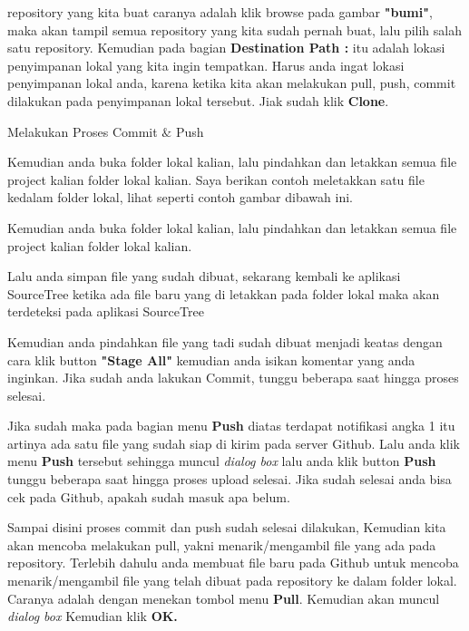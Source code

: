 \vspace{12pt}
\noindent 
repository yang kita buat caranya adalah klik browse pada gambar \textbf{"bumi"}, maka akan tampil semua repository yang kita sudah pernah buat, lalu pilih salah satu repository. Kemudian pada bagian \textbf{Destination Path : }itu adalah lokasi penyimpanan lokal yang kita ingin tempatkan.\vspace{\baselineskip}
\vspace{\baselineskip}
Harus anda ingat lokasi penyimpanan lokal anda, karena ketika kita akan melakukan pull, push, commit dilakukan pada penyimpanan lokal tersebut. Jiak sudah klik \textbf{Clone}. \par
\noindent 
Melakukan Proses Commit  $  \&  $ Push \par
\vspace{12pt}
\noindent 
Kemudian anda buka folder lokal kalian, lalu pindahkan dan letakkan semua file project kalian folder lokal kalian. Saya berikan contoh meletakkan satu file kedalam folder lokal, lihat seperti contoh gambar dibawah ini. \par
\vspace{12pt}
\noindent 
Kemudian anda buka folder lokal kalian, lalu pindahkan dan letakkan semua file project kalian folder lokal kalian. \par
\vspace{12pt}
\noindent 
Lalu anda simpan file yang sudah dibuat, sekarang kembali ke aplikasi SourceTree ketika ada file baru yang di letakkan pada folder lokal maka akan terdeteksi pada aplikasi SourceTree \par
\vspace{12pt}
\noindent 
Kemudian anda pindahkan file yang tadi sudah dibuat menjadi keatas dengan cara klik button \textbf{"Stage All"} $  $kemudian anda isikan komentar yang anda inginkan. Jika sudah anda lakukan Commit, tunggu beberapa saat hingga proses selesai. \par
\vspace{12pt}
\noindent 
Jika sudah maka pada bagian menu \textbf{Push }diatas terdapat notifikasi angka 1 itu artinya ada satu file yang sudah siap di kirim pada server Github. Lalu anda klik menu \textbf{Push} $  $tersebut sehingga muncul \textit{dialog box }lalu anda klik button \textbf{Push} $  $tunggu beberapa saat hingga proses upload selesai. Jika sudah selesai anda bisa cek pada Github, apakah sudah masuk apa belum. \par
\vspace{12pt}
\noindent 
Sampai disini proses commit dan push sudah selesai dilakukan, Kemudian kita akan mencoba melakukan pull, yakni menarik/mengambil file yang ada pada repository. Terlebih dahulu anda membuat file baru pada Github untuk mencoba menarik/mengambil file yang telah dibuat pada repository ke dalam folder lokal. Caranya adalah dengan menekan tombol menu \textbf{Pull}. Kemudian akan muncul \textit{dialog box} Kemudian klik \textbf{OK.} \par
